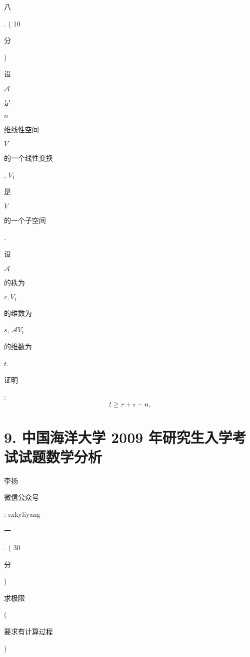 \documentclass[10pt]{article}
\begin{document}
\begin{CJK}{UTF8}{mj}八\end{CJK}. ( 10 \begin{CJK}{UTF8}{mj}分\end{CJK}) \begin{CJK}{UTF8}{mj}设\end{CJK} $\mathscr{A}$ \begin{CJK}{UTF8}{mj}是\end{CJK} $n$ \begin{CJK}{UTF8}{mj}维线性空间\end{CJK} $V$ \begin{CJK}{UTF8}{mj}的一个线性变换\end{CJK}, $V_{1}$ \begin{CJK}{UTF8}{mj}是\end{CJK} $V$ \begin{CJK}{UTF8}{mj}的一个子空间\end{CJK}. \begin{CJK}{UTF8}{mj}设\end{CJK} $\mathscr{A}$ \begin{CJK}{UTF8}{mj}的秩为\end{CJK} $r, V_{1}$ \begin{CJK}{UTF8}{mj}的维数为\end{CJK} $s$, $\mathscr{A} V_{1}$ \begin{CJK}{UTF8}{mj}的维数为\end{CJK} $t$. \begin{CJK}{UTF8}{mj}证明\end{CJK}:
$$
t \geqslant r+s-n .
$$

\section{9. 中国海洋大学 2009 年研究生入学考试试题数学分析}
\begin{CJK}{UTF8}{mj}李扬\end{CJK}

\begin{CJK}{UTF8}{mj}微信公众号\end{CJK}: sxkyliyang

\begin{CJK}{UTF8}{mj}一\end{CJK}. ( 30 \begin{CJK}{UTF8}{mj}分\end{CJK}) \begin{CJK}{UTF8}{mj}求极限\end{CJK} (\begin{CJK}{UTF8}{mj}要求有计算过程\end{CJK})
\end{document}

